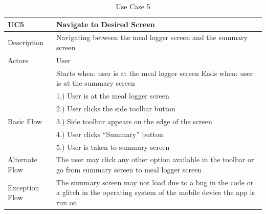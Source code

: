 \documentclass{article}
\begin{document}
\begin{appendicies}
\begin{table}[!htbp]
\centering
\hspace*{-0.5cm}
\begin{tabular}{||m{6cm}|m{6cm}||}
    \hline
    UC5 & Navigate to Desired Screen\\
    \hline
    Description & Navigating between the meal logger screen and the summary screen\\
    \hline
    Actors & User\\
    \hline
    & Starts when: user is at the meal logger screen \newline
    Ends when: user is at the summary screen\\
    \hline
    \multirow{5}{\hsize}{Basic Flow} 
                                    & 1.) User is at the meal logger screen\\
                                    & 2.) User clicks the side toolbar button\\ 
                                    & 3.) Side toolbar appears on the edge of the screen\\
                                    & 4.) User clicks “Summary” button\\
                                    & 5.) User is taken to summary screen\\
    \hline
    Alternate Flow & The user may click any other option available in the toolbar or go from summary screen to meal logger screen\\
    \hline 
    Exception Flow & The summary screen may not load due to a bug in the code or a glitch in the operating system of the mobile device the app is run on\\
\hline
\end{tabular}
\caption{Use Case 5}
\label{table:UC5}
\end{table}



\end{appendicies}
\end{document}
